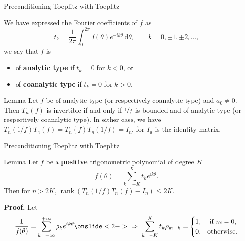 \documentclass[aspectratio=169,xcolor=dvipsnames]{beamer}
\begin{document}
\begin{frame}{Preconditioning Toeplitz with Toeplitz}
	
We have expressed the Fourier coefficients of $f$ as
\[
t_k = \frac{1}{2\pi}\int_{0}^{2\pi} f(\theta) e^{-ik\theta}\,\mathrm{d}\theta, \qquad k=0,\pm1,\pm2,\ldots,
\]
we say that $f$ is 
\begin{itemize}
	\item[\faBook] of \textbf{analytic type} if $t_k = 0$ for $k < 0$, or
	\item[\faBook] of \textbf{coanalytic type} if $t_k = 0$ for $k > 0$.
\end{itemize}

\begin{alertblock}{Lemma}
Let $f$ be of analytic type (or respectively coanalytic type) and $a_0 \neq 0$. Then $T_n(f)$ is invertible if and only if $\nicefrac{1}{f}$ is bounded and of analytic type (or respectively coanalytic type). In either case, we have $T_n(1/f)T_n(f) = T_n(f) T_n(1/f) = I_n$, for $I_n$ is the identity matrix.
\end{alertblock}

	
\end{frame}

\begin{frame}{Preconditioning Toeplitz with Toeplitz}

\begin{alertblock}{Lemma \parencite{MR1230358}}
Let $f$ be a \textbf{positive} trigonometric polynomial of degree $K$ 
\[
f(\theta) = \sum_{k=-K}^{K} t_k e^{ik\theta}.
\]
Then for $n > 2K$, $\operatorname{rank}(T_n(1/f)T_n(f) - I_n) \leq 2K$.
\end{alertblock}

\textbf{Proof.} Let 
\[
\frac{1}{f(\theta)} = \sum_{k = -\infty}^{+\infty} \rho_k e^{ik\theta} \onslide<2->{\;\Rightarrow\; \sum_{k=-K}^{K} t_k \rho_{m-k} = \begin{cases}
1, & \text{ if } m = 0,\\
0, & \text{otherwise}.
\end{cases} }
\]
\end{frame}
\end{document}
